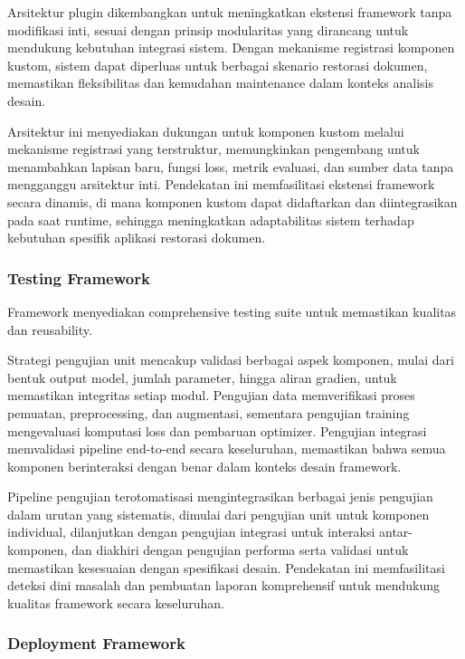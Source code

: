 \documentclass[12pt,a4paper]{article}
\begin{document}
Arsitektur plugin dikembangkan untuk meningkatkan ekstensi framework tanpa modifikasi inti, sesuai dengan prinsip modularitas yang dirancang untuk mendukung kebutuhan integrasi sistem. Dengan mekanisme registrasi komponen kustom, sistem dapat diperluas untuk berbagai skenario restorasi dokumen, memastikan fleksibilitas dan kemudahan maintenance dalam konteks analisis desain.

Arsitektur ini menyediakan dukungan untuk komponen kustom melalui mekanisme registrasi yang terstruktur, memungkinkan pengembang untuk menambahkan lapisan baru, fungsi loss, metrik evaluasi, dan sumber data tanpa mengganggu arsitektur inti. Pendekatan ini memfasilitasi ekstensi framework secara dinamis, di mana komponen kustom dapat didaftarkan dan diintegrasikan pada saat runtime, sehingga meningkatkan adaptabilitas sistem terhadap kebutuhan spesifik aplikasi restorasi dokumen.

\subsubsection{Testing Framework}
\label{subsubsec:testing-framework}

Framework menyediakan comprehensive testing suite untuk memastikan kualitas dan reusability.

Strategi pengujian unit mencakup validasi berbagai aspek komponen, mulai dari bentuk output model, jumlah parameter, hingga aliran gradien, untuk memastikan integritas setiap modul. Pengujian data memverifikasi proses pemuatan, preprocessing, dan augmentasi, sementara pengujian training mengevaluasi komputasi loss dan pembaruan optimizer. Pengujian integrasi memvalidasi pipeline end-to-end secara keseluruhan, memastikan bahwa semua komponen berinteraksi dengan benar dalam konteks desain framework.

Pipeline pengujian terotomatisasi mengintegrasikan berbagai jenis pengujian dalam urutan yang sistematis, dimulai dari pengujian unit untuk komponen individual, dilanjutkan dengan pengujian integrasi untuk interaksi antar-komponen, dan diakhiri dengan pengujian performa serta validasi untuk memastikan kesesuaian dengan spesifikasi desain. Pendekatan ini memfasilitasi deteksi dini masalah dan pembuatan laporan komprehensif untuk mendukung kualitas framework secara keseluruhan.

\subsubsection{Deployment Framework}
\label{subsubsec:deployment-framework}
\end{document}
